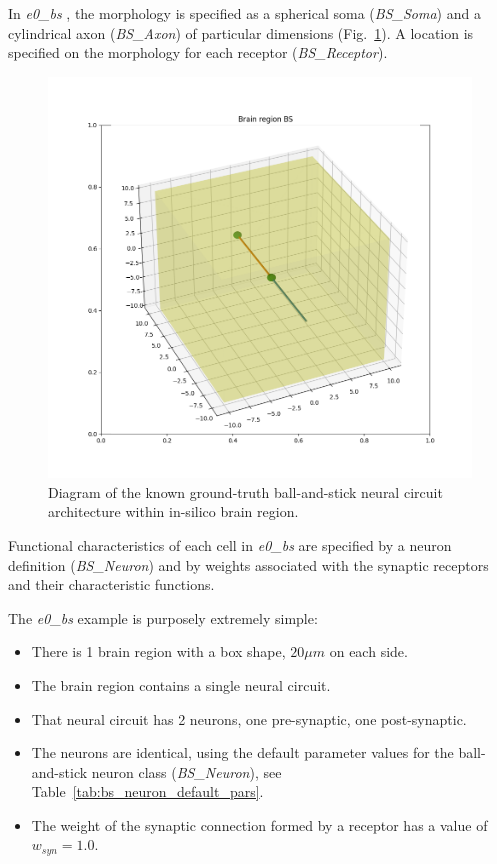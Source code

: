 \documentclass{ldr-article}
\def\firstexp{\textit{e0\_bs} }
\begin{document}
In \firstexp, the morphology is specified as a spherical soma (\textit{BS\_Soma}) and a cylindrical axon (\textit{BS\_Axon}) of particular dimensions (Fig.~\ref{fig:KGT-architecture}). A location is specified on the morphology for each receptor (\textit{BS\_Receptor}).

\begin{figure}
	\centering
	\includegraphics[width=1\linewidth]{figures/e0_bs.png}
	\caption{Diagram of the known ground-truth ball-and-stick neural circuit architecture within in-silico brain region.
	}
	\label{fig:KGT-architecture}
\end{figure}

Functional characteristics of each cell in \firstexp are specified by a neuron definition (\textit{BS\_Neuron}) and by weights associated with the synaptic receptors and their characteristic functions.

The \firstexp example is purposely extremely simple:
\begin{itemize}
	\item There is 1 brain region with a box shape, $20 \mu m$ on each side.
	\item The brain region contains a single neural circuit.
	\item That neural circuit has 2 neurons, one pre-synaptic, one post-synaptic.
	\item The neurons are identical, using the default parameter values for the ball-and-stick neuron class (\textit{BS\_Neuron}), see Table~\ref{tab:bs_neuron_default_pars}.
	\item The weight of the synaptic connection formed by a receptor has a value of $w_{syn} = 1.0$.
\end{itemize}
\end{document}
